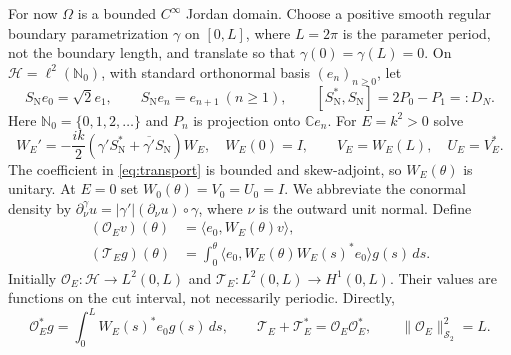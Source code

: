 \documentclass[11pt]{amsart}
\numberwithin{equation}{section}
\newcommand{\HH}{\mathscr H}
\newcommand{\SN}{S_{\mathrm N}}
\newcommand{\OO}{\mathcal O}
\newcommand{\TT}{\mathcal T}
\newcommand{\ip}[2]{\langle #1,#2\rangle}
\newcommand{\norm}[1]{\lVert #1\rVert}
\begin{document}
For now $\Omega$ is a bounded $C^\infty$ Jordan domain. Choose a positive
smooth regular boundary parametrization $\gamma$ on $[0,L]$, where $L=2\pi$ is the
parameter period, not the boundary length,
and translate so that $\gamma(0)=\gamma(L)=0$. On
$\HH=\ell^2(\mathbb N_0)$, with standard orthonormal basis
$(e_n)_{n\ge0}$, let
\[
 \SN e_0=\sqrt2 e_1,\qquad \SN e_n=e_{n+1}\ (n\ge1),
 \qquad [\SN^*,\SN]=2P_0-P_1=:D_N.
\]
Here $\mathbb N_0=\{0,1,2,\ldots\}$ and $P_n$ is projection onto $\mathbb C e_n$. For $E=k^2>0$ solve
\begin{equation}\label{eq:transport}
 W_E'=-\frac{ik}{2}(\gamma'\SN^*+\overline{\gamma'}\SN)W_E,
 \quad W_E(0)=I,\qquad V_E=W_E(L),\quad U_E=V_E^*.
\end{equation}
The coefficient in \eqref{eq:transport} is bounded and skew-adjoint,
so $W_E(\theta)$ is unitary. At $E=0$ set
$W_0(\theta)=V_0=U_0=I$.
We abbreviate the conormal density by
$\partial_\nu^\gamma u=|\gamma'|(\partial_\nu u)\circ\gamma$,
where $\nu$ is the outward unit normal. Define
\begin{align*}
 (\OO_Ev)(\theta)&=\ip{e_0}{W_E(\theta)v},\\
 (\TT_Eg)(\theta)&=\int_0^\theta
 \ip{e_0}{W_E(\theta)W_E(s)^*e_0}g(s)\,ds.
\end{align*}
Initially $\OO_E:\HH\to L^2(0,L)$ and
$\TT_E:L^2(0,L)\to H^1(0,L)$. Their values are functions on the
cut interval, not necessarily periodic. Directly,
\begin{equation}\label{eq:OTadj}
 \OO_E^*g=\int_0^L W_E(s)^*e_0g(s)\,ds,
 \qquad \TT_E+\TT_E^*=\OO_E\OO_E^*,
 \qquad\norm{\OO_E}_{\mathcal S_2}^2=L.
\end{equation}
\end{document}
